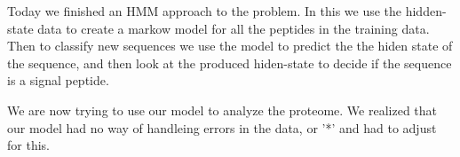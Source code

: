 \documentclass[a4paper]{tufte-handout}
\begin{document}

Today we finished an HMM approach to the problem. In this we use the
hidden-state data to create a markow model for all the peptides in the training
data. Then to classify new sequences we use the model to predict the the hiden
state of the sequence, and then look at the produced hiden-state to decide if
the sequence is a signal peptide.


We are now trying to use our model to analyze the proteome. We realized that
our model had no way of handleing errors in the data, or '*' and had to adjust
for this. 

\hrulefill



\end{document}
